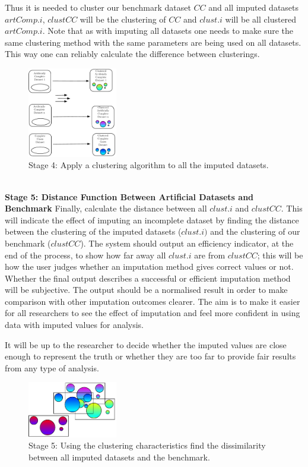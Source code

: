 \documentclass[conference,compsoc]{IEEEtran}
\begin{document}
	Thus it is needed to cluster our benchmark dataset $CC$ and all imputed datasets $artComp.i$, $clustCC$ will be the clustering of $CC$ and $clust.i$ will be all clustered $artComp.i$. Note that as with imputing all datasets one needs to make sure the same clustering method with the same parameters are being used on all datasets. This way one can reliably calculate the difference between clusterings.
	\begin{figure}[!ht]
		\caption{Stage 4: Apply a clustering algorithm to all the imputed datasets.}
		\centering
		\includegraphics[width=0.35\textwidth]{stage4-2.pdf}
	\end{figure}
	\\
	\indent \textbf{Stage 5: Distance Function Between Artificial Datasets and Benchmark}
	Finally, calculate the distance between all $clust.i$ and $clustCC$. This will indicate the effect of imputing an incomplete dataset by finding the distance between the clustering of the imputed datasets ($clust.i)$ and the clustering of our benchmark ($clustCC$). The system should output an efficiency indicator, at the end of the process, to show how far away all $clust.i$ are from $clustCC$; this will be how the user judges whether an imputation method gives correct values or not. Whether the final output describes a successful or efficient imputation method will be subjective. The output should be a normalised result in order to make comparison with other imputation outcomes clearer. The aim is to make it easier for all researchers to see the effect of imputation and feel more confident in using data with imputed values for analysis.

	It will be up to the researcher to decide whether the imputed values are close enough to represent the truth or whether they are too far to provide fair results from any type of analysis.
	\begin{figure}[!ht]
		\centering
		\includegraphics[width=0.35\textwidth]{stage5-2.pdf}
		\caption{Stage 5: Using the clustering characteristics find the dissimilarity between all imputed datasets and the benchmark.}
		\label{fig:stage-5}
	\end{figure}
\end{document}
